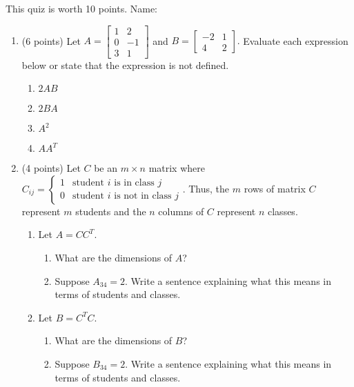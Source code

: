 \documentclass[11pt,fleqn]{article}
\newcommand{\bbm}{\begin{bmatrix}}
\newcommand{\ebm}{\end{bmatrix}}
\begin{document}
\renewcommand{\headrulewidth}{0pt}
\newcommand{\blank}[1]{\rule{#1}{0.75pt}}
\renewcommand{\d}{\displaystyle}
This quiz is worth 10 points. \hfill {\Large{Name: \underline{\hspace{2in}}}}
\begin{enumerate}
\item (6 points) Let $A=\bbm 1&2\\0&-1\\3&1 \ebm$ and $B=\bbm -2&1\\4&2 \ebm.$ Evaluate each expression below or state that the expression is not defined.\\
	\begin{enumerate}
	\item $2AB$
	\vfill
	\item $2BA$
	\vfill
	\item $A^2$
	\vfill
	\item $AA^T$
	\vfill
	\end{enumerate}
\newpage
\item (4 points) Let $C$ be an $m \times n$ matrix where $C_{ij}=\begin{cases} 1 & \text{student } i \text{ is in class } j \\
0 &  \text{student } i \text{ is not in class } j \end{cases}.$ Thus, the $m$ rows of matrix $C$ represent $m$ students and the $n$ columns of $C$ represent $n$ classes. \\
	\begin{enumerate}
	\item Let $A=CC^T.$
		\begin{enumerate}
		\item What are the dimensions of $A$?
		\vspace{.5in}
		\item Suppose $A_{34}=2.$ Write a sentence explaining what this means in terms of students and classes.
		\vfill
		\end{enumerate}
	\item Let $B=C^TC.$
		\begin{enumerate}
		\item What are the dimensions of $B$?
		\vspace{.5in}
		\item Suppose $B_{34}=2.$ Write a sentence explaining what this means in terms of students and classes.
		\vfill
		\end{enumerate}
	\end{enumerate}	
\end{enumerate}
\end{document}
